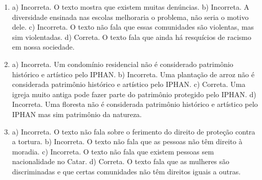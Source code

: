 \begin{enumerate}
\item
a) Incorreta. O texto mostra que existem muitas denúncias.
b) Incorreta. A diversidade ensinada nas escolas melhoraria o problema,
não seria o motivo dele.
c) Incorreta. O texto não fala que essas comunidades são violentas, mas
sim violentadas.
d) Correta. O texto fala que ainda há resquícios de racismo em nossa
sociedade.

\item
a) Incorreta. Um condomínio residencial não é considerado patrimônio
histórico e artístico pelo IPHAN.
b) Incorreta. Uma plantação de arroz não é considerada patrimônio
histórico e artístico pelo IPHAN.
c) Correta. Uma igreja muito antiga pode fazer parte do patrimônio
protegido pelo IPHAN.
d) Incorreta. Uma floresta não é considerada patrimônio histórico e
artístico pelo IPHAN mas sim patrimônio da natureza.

\item
a) Incorreta. O texto não fala sobre o ferimento do direito de proteção
contra a tortura.
b) Incorreta. O texto não fala que as pessoas não têm direito à moradia.
c) Incorreta. O texto não fala que existem pessoas sem nacionalidade no
Catar.
d) Correta. O texto fala que as mulheres são discriminadas e que certas
comunidades não têm direitos iguais a outras.
\end{enumerate}

